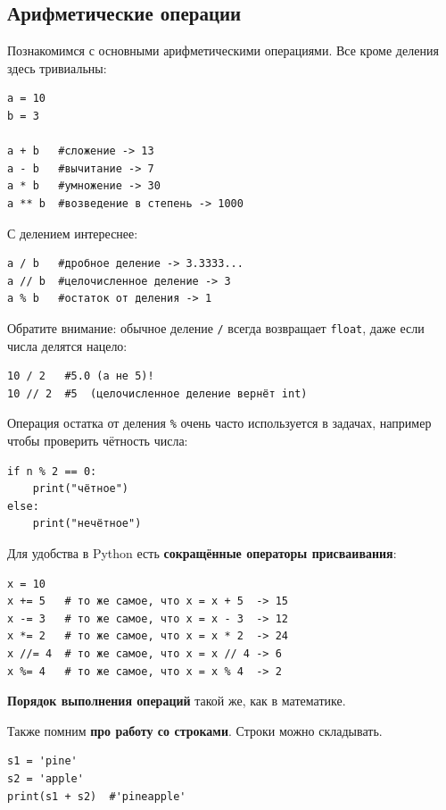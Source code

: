 \documentclass[12pt,a4paper]{article}
\begin{document}
\subsection*{Арифметические операции}

Познакомимся с основными арифметическими операциями. Все кроме деления здесь тривиальны:

\begin{verbatim}
a = 10
b = 3

a + b   #сложение -> 13
a - b   #вычитание -> 7
a * b   #умножение -> 30
a ** b  #возведение в степень -> 1000
\end{verbatim}

С делением интереснее:
\begin{verbatim}
a / b   #дробное деление -> 3.3333...
a // b  #целочисленное деление -> 3
a % b   #остаток от деления -> 1
\end{verbatim}

Обратите внимание: обычное деление \texttt{/} всегда возвращает \texttt{float}, даже если числа делятся нацело:

\begin{verbatim}
10 / 2   #5.0 (а не 5)!
10 // 2  #5  (целочисленное деление вернёт int)
\end{verbatim}

Операция остатка от деления \texttt{\%} очень часто используется в задачах, например чтобы проверить чётность числа:

\begin{verbatim}
if n % 2 == 0:
    print("чётное")
else:
    print("нечётное")
\end{verbatim}

Для удобства в Python есть \textbf{сокращённые операторы присваивания}:

\begin{verbatim}
x = 10
x += 5   # то же самое, что x = x + 5  -> 15
x -= 3   # то же самое, что x = x - 3  -> 12
x *= 2   # то же самое, что x = x * 2  -> 24
x //= 4  # то же самое, что x = x // 4 -> 6
x %= 4   # то же самое, что x = x % 4  -> 2
\end{verbatim}

\textbf{Порядок выполнения операций} такой же, как в математике.
\bigskip

Также помним \textbf{про работу со строками}. Строки можно складывать.
\begin{verbatim}
s1 = 'pine'
s2 = 'apple'
print(s1 + s2)  #'pineapple'
\end{verbatim}
\end{document}
